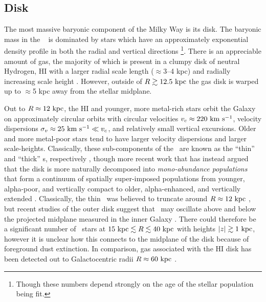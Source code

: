 \subsection{Disk}

The most massive baryonic component of the Milky Way is its disk. The baryonic mass in the \mwdisk\ \citep[$M_d \approx 5 \times 10^{10}~\msun$;][]{mcmillan11, todo} is dominated by stars which have an approximately exponential density profile in both the radial and vertical directions \citep[with scale lengths of $\approx$2--3 kpc and $\approx$200--400 pc, respectively; ][]{mcmillan11, bovy12-spatialMAP, todo}\footnote{Though these numbers depend strongly on the age of the stellar population being fit.}. There is an appreciable amount of  gas, the majority of which is present in a clumpy disk of neutral Hydrogen, HI \citep[$M_{\rm HI} \approx 8 \times 10^9~\msun$;][]{kalberla09} with a larger radial scale length ($\approx$3--4 kpc) and radially increasing scale height \citep[$\approx$100 pc at $R=8~\kpc$ to $\approx$1 kpc at $R=25~\kpc$;][]{wouterloot90, merrifield92}. However, outside of $R \gtrsim 12.5~\mathrm{kpc}$ the gas disk is warped up to $\approx$5 kpc away from the stellar midplane. 

Out to $R\approx 12~\mathrm{kpc}$, the HI and younger, more metal-rich stars orbit the Galaxy on approximately circular orbits with circular velocities $v_c \approx 220~\mathrm{km}~\mathrm{s}^{-1}$, velocity dispersions $\sigma_v \approx 25~\mathrm{km}~\mathrm{s}^{-1} \ll v_c$, and relatively small vertical excursions. Older and more metal-poor stars tend to have larger velocity dispersions and larger scale-heights. Classically, these sub-components of the \mwdisk\ are known as the ``thin'' and ``thick'' \mwdisk s, respectively \citep{todo}, though more recent work that has instead argued that the disk is more naturally decomposed into \emph{mono-abundance populations} that form a continuum of spatially super-imposed populations from younger, alpha-poor, and vertically compact to older, alpha-enhanced, and vertically extended \citep[see, e.g., Figure~12 and Section~6 in][]{rixbovy13}. Classically, the thin \mwdisk\ was believed to truncate around $R \approx 12~\mathrm{kpc}$ \citep{todo}, but recent studies of the outer disk suggest that \mwdisk\ may oscillate above and below the projected midplane measured in the inner Galaxy \citep{xu15, apw15-triand}. There could therefore be a significant number of \mwdisk\ stars at $15~\mathrm{kpc} \lesssim R \lesssim 40~\mathrm{kpc}$ with heights $|z| \gtrsim 1~\mathrm{kpc}$, however it is unclear how this connects to the midplane of the disk because of foreground dust extinction. In comparison, gas associated with the HI disk has been detected out to Galactocentric radii $R \approx 60~\mathrm{kpc}$ \citep{kalberla08}.

